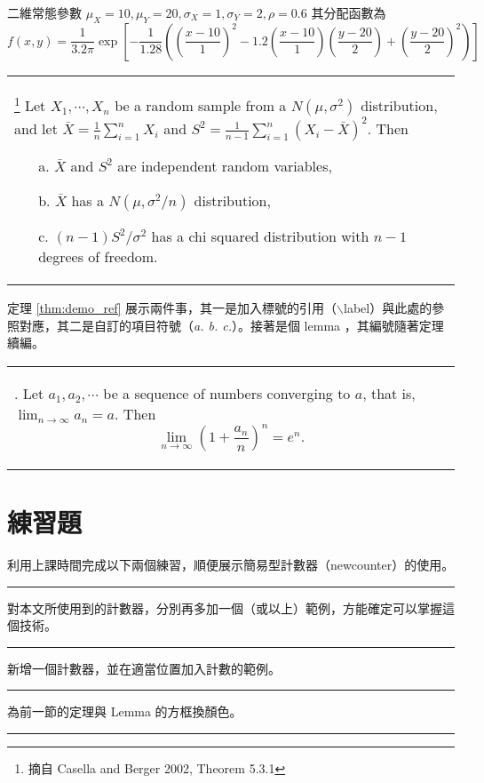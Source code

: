 \begin{ex} %
二維常態參數 $\mu_X=10, \mu_Y=20, \sigma_X=1, \sigma_Y=2, \rho=0.6$ 其分配函數為
\begin{equation*}
f(x,y)=\frac{1}{3.2\pi}\exp\left[-\frac{1}{1.28}\left((\frac{x-10}{1})^2
       -1.2(\frac{x-10}{1})(\frac{y-20}{2})+(\frac{y-20}{2})^2 \right)\right]
\end{equation*}
\end{ex}
\bigskip
\begin{center}\colorbox{slight}{\begin{tabular}{p{}}
\begin{thm}\label{thm:demo_ref}\footnote{摘自 Casella and Berger 2002, Theorem 5.3.1} %
Let $X_1, \cdots, X_n$ be a random sample from a $N(\mu, \sigma^2)$ distribution, and let
$\bar{X}=\frac{1}{n}\sum_{i=1}^n X_i$ and $S^2=\frac{1}{n-1}\sum_{i=1}^n (X_i-\bar{X})^2$.  Then
\begin{itemize}
\item[a.] $\bar{X}$ and $S^2$ are independent random variables,
\item[b.] $\bar{X}$ has a $N(\mu, \sigma^2/n)$ distribution,
\item[c.] $(n-1)S^2/\sigma^2$ has a chi squared distribution with $n-1$ degrees of freedom.
\end{itemize}
\end{thm}
 \end{tabular}}\end{center}
\bigskip

定理 \ref{thm:demo_ref} 展示兩件事，其一是加入標號的引用（$\backslash$label）與此處的參照對應，其二是自訂的項目符號（\textit{a. b. c.}）。接著是個 lemma ，其編號隨著定理續編。
\begin{center}\colorbox{slight}{\begin{tabular}{p{}}
\begin{lemma}. Let $a_1,a_2,\cdots$ be a sequence of numbers converging to $a$, that is, $\lim_{n\rightarrow \infty} a_n=a$. Then
$$\lim_{n\rightarrow \infty} (1+\frac{a_n}{n})^n=e^n.$$
\end{lemma}
 \end{tabular}}\end{center}

\section{練習題}
利用上課時間完成以下兩個練習，順便展示簡易型計數器（newcounter）的使用。

\rule{\textwidth}{0.2pt}
\thequiz \;\;對本文所使用到的計數器，分別再多加一個（或以上）範例，方能確定可以掌握這個技術。\\
\rule{\textwidth}{0.2pt}
\addtocounter{quiz}{1} 		%
\thequiz \;\;新增一個計數器，並在適當位置加入計數的範例。\\
\rule{\textwidth}{0.2pt}
\addtocounter{quiz}{1} 		%
\thequiz \;\;為前一節的定理與 Lemma 的方框換顏色。\\
\rule{\textwidth}{0.2pt}

